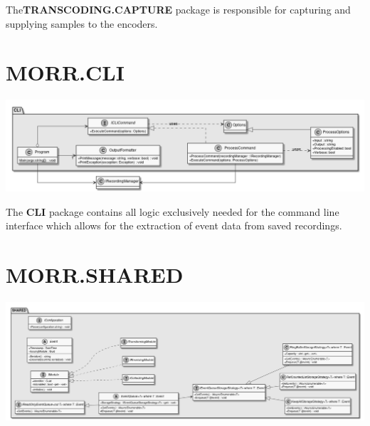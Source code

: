 The\textbf{TRANSCODING.CAPTURE} package is responsible for capturing and supplying samples to the encoders.

\begin{packif}
\end{packif}

\begin{packclass}
\end{packclass}

\newpage
\section{MORR.CLI}

\begin{center}
    \includegraphics[width=1.0\textwidth]{resources/Packages/CLI.png}
\end{center}

The \textbf{CLI} package contains all logic exclusively needed for the command line interface which allows for the extraction of event data from saved recordings.

\begin{packif}
\end{packif}

\begin{packclass}
\end{packclass}

\newpage
\section{MORR.SHARED}

\begin{center}
    \includegraphics[width=1.0\textwidth]{resources/Packages/SHARED.png}
\end{center}

